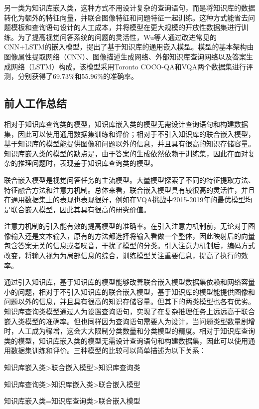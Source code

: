 另一类为知识库嵌入类，这种方式不用设计复杂的查询语句，而是将知识库的数据转化为额外的特征向量，并联合图像特征和问题特征一起训练。这种方式能省去问题模板和查询语句设计的人工成本，并将模型在更大规模的开放性数据集进行训练。为了提高视觉问答系统的问题的灵活性，Wu等人通过改进常见的CNN+LSTM的嵌入模型，提出了基于知识库的通用嵌入模型。模型的基本架构由图像属性提取网络（CNN）、图像描述生成网络、外部知识库查询网络以及答案生成网络（LSTM）构成。该模型采用Toronto COCO-QA和VQA两个数据集进行评测，分别获得了69.73\%和55.96\%的准确率。

\subsection{前人工作总结}

相对于知识库查询类的模型，知识库嵌入类的模型无需设计查询语句和构建数据集，因此可以使用通用数据集训练和评价；相对于不引入知识库的联合嵌入模型，基于知识库的模型能提供图像和问题以外的信息，并且具有很高的知识存储容量。知识库嵌入类的模型的缺点是，由于答案的生成依然依赖于训练集，因此在面对复杂的推理问题时，表现差于知识库查询类的模型。

联合嵌入模型是视觉问答任务的主流模型。大量模型探索了不同的特征提取方法、特征融合方法和注意力机制。总体来看，联合嵌入模型具有较很高的灵活性，并且在通用数据集上的表现也表现很好，例如在VQA挑战中2015-2019年的最优模型均是联合嵌入模型，因此其具有很高的研究价值。

注意力机制的引入能有效的提高模型的准确率。在引入注意力机制前，无论对于图像输入还是文本输入，原有的方法都选择将输入看做一个整体，因此映射后的向量包含答案无关的信息或者噪音，干扰了模型的分类。引入注意力机制后，编码方式改变，将输入视为为局部信息的综合，训练模型关注重要信息，提高了执行的效率。

通过引入知识库，基于知识库的模型能够改善联合嵌入模型数据集依赖和网络容量小的问题，相对于不引入知识库的联合嵌入模型，基于知识库的模型能提供图像和问题以外的信息，并且具有很高的知识存储容量。但其下的两类模型也各有优劣。知识库查询类模型通过人为设置查询语句，实现了在复杂推理任务上远远高于联合嵌入类模型的准确率。但也同样因为查询语句需要人为设计，当问题类型数量剧增时，人工成为骤增，这会大大限制分类数量和分类模型的精度。相对于知识库查询类的模型，知识库嵌入类的模型无需设计查询语句和构建数据集，因此可以使用通用数据集训练和评价。三种模型的比较可以简单描述为以下关系：
\begin{description}[labelindent=2em, leftmargin=6em, style=sameline]
\item [解决识别类问题：]知识库嵌入类>联合嵌入模型>知识库查询类
\item [解决推理类问题：]知识库查询类>知识库嵌入类>联合嵌入模型
\item [模型迁移能力：]知识库嵌入类=知识库查询类>联合嵌入模型
\end{description}

